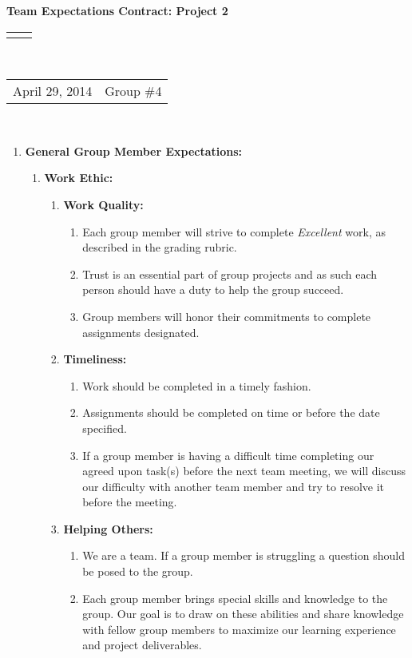 \documentclass[12pt]{article}
\renewcommand{\title}[1]{\textbf{#1}\\}
\renewcommand{\line}{\begin{tabularx}{\textwidth}{X>{\raggedleft}X}\hline\\\end{tabularx}\\[-0.5cm]}
\newcommand{\leftright}[2]{\begin{tabularx}{\textwidth}{X>{\raggedleft}X}#1%
& #2\\\end{tabularx}\\[-0.5cm]}
\begin{document}
\title{Team Expectations Contract: Project 2 }
\line
\leftright{April 29, 2014}{Group \#4} %
\vspace{5mm}

\begin{enumerate}
\item \textbf{General Group Member Expectations:} 
\begin{enumerate}
\item \textbf{Work Ethic:}
\begin{enumerate}
\item \textbf{Work Quality: }
\begin{enumerate}
\item  Each group member will strive to complete \emph{Excellent} work, as described in the grading rubric. 
\item Trust is an essential part of group projects and as such each person should have a duty to help the group succeed. 
\item Group members will honor their commitments to complete assignments designated. 
\end{enumerate}
\item \textbf{Timeliness: }
\begin{enumerate}
\item Work should be completed in a timely fashion.
\item Assignments should be completed on time or before the date specified. 
\item If a group member is having a difficult time completing our agreed upon task(s) before the next team meeting, we will discuss our difficulty with another team member and try to resolve it before the meeting. 
\end{enumerate}
\item \textbf{Helping Others: }
\begin{enumerate}
\item We are a team.  If a group member is struggling a question should be posed to the group.  
\item Each group member brings special skills and knowledge to the group.  Our goal is to draw on these abilities and share knowledge with fellow group members to maximize our learning experience and project deliverables. 
\end{enumerate}
\end{enumerate}


\end{enumerate}
\end{enumerate}
\end{document}
